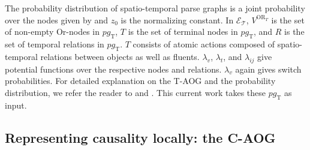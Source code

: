 \documentclass[10pt,journal,letterpaper,compsoc]{IEEEtran}
\begin{document}
The probability distribution of spatio-temporal parse graphs is a joint probability over the nodes given by 
and $z_0$ is the normalizing constant.  In $\mathcal{E_{\textrm{T}}}$, $ V^{\mathrm{OR}_T}$ is the set of non-empty Or-nodes in $pg_{\mathrm{T}}$, $T$ is the set of terminal nodes in $pg_{\mathrm{T}}$, and $R$ is the set of temporal relations in $pg_{\mathrm{T}}$.  $T$ consists of atomic actions composed of spatio-temporal relations between objects as well as fluents.  $\lambda_v$, $\lambda_t$, and $\lambda_{ij}$ give potential functions over the respective nodes and relations.  $\lambda_v$ again gives switch probabilities.  For detailed explanation on the T-AOG and the probability distribution, we refer the reader to \cite{Mingtao} and \cite{StochasticGrammar}.  This current work takes these $pg_{\mathrm{T}}$ as input.




\subsection{Representing causality locally: the C-AOG}  


\end{document}

